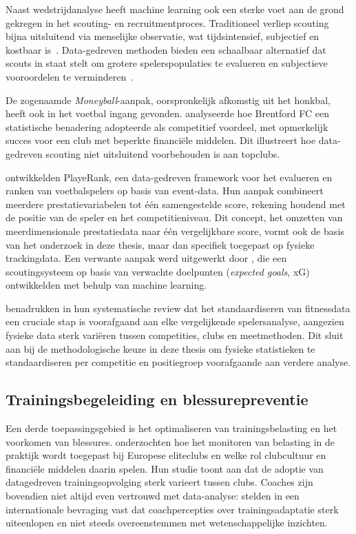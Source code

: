 Naast wedstrijdanalyse heeft machine learning ook een sterke voet aan de grond gekregen in het scouting- en recruitmentproces. Traditioneel verliep scouting bijna uitsluitend via menselijke observatie, wat tijdsintensief, subjectief en kostbaar is~\autocite{CallinanEtAl2023}. Data-gedreven methoden bieden een schaalbaar alternatief dat scouts in staat stelt om grotere spelerspopulaties te evalueren en subjectieve vooroordelen te verminderen~\autocite{HenriettaVuorenmaa}.
 
De zogenaamde \textit{Moneyball}-aanpak, oorspronkelijk afkomstig uit het honkbal, heeft ook in het voetbal ingang gevonden. \textcite{liam-2022} analyseerde hoe Brentford FC een statistische benadering adopteerde als competitief voordeel, met opmerkelijk succes voor een club met beperkte financiële middelen. Dit illustreert hoe data-gedreven scouting niet uitsluitend voorbehouden is aan topclubs.
 
\textcite{Pappalardo2018_PlayeRank} ontwikkelden PlayeRank, een data-gedreven framework voor het evalueren en ranken van voetbalspelers op basis van event-data. Hun aanpak combineert meerdere prestatievariabelen tot één samengestelde score, rekening houdend met de positie van de speler en het competitieniveau. Dit concept, het omzetten van meerdimensionale prestatiedata naar één vergelijkbare score, vormt ook de basis van het onderzoek in deze thesis, maar dan specifiek toegepast op fysieke trackingdata. Een verwante aanpak werd uitgewerkt door \textcite{10544261}, die een scoutingsysteem op basis van verwachte doelpunten (\textit{expected goals}, xG) ontwikkelden met behulp van machine learning.
 
\textcite{yunus-2024} benadrukken in hun systematische review dat het standaardiseren van fitnessdata een cruciale stap is voorafgaand aan elke vergelijkende spelersanalyse, aangezien fysieke data sterk variëren tussen competities, clubs en meetmethoden. Dit sluit aan bij de methodologische keuze in deze thesis om fysieke statistieken te standaardiseren per competitie en positiegroep voorafgaande aan verdere analyse.
 
\subsection{Trainingsbegeleiding en blessurepreventie}
 
Een derde toepassingsgebied is het optimaliseren van trainingsbelasting en het voorkomen van blessures. \textcite{HoutmeyersEtAl2021} onderzochten hoe het monitoren van belasting in de praktijk wordt toegepast bij Europese eliteclubs en welke rol clubcultuur en financiële middelen daarin spelen. Hun studie toont aan dat de adoptie van datagedreven trainingsopvolging sterk varieert tussen clubs. Coaches zijn bovendien niet altijd even vertrouwd met data-analyse: \textcite{AnyadikeDanesEtAl2023} stelden in een internationale bevraging vast dat coachpercepties over trainingsadaptatie sterk uiteenlopen en niet steeds overeenstemmen met wetenschappelijke inzichten.
 
